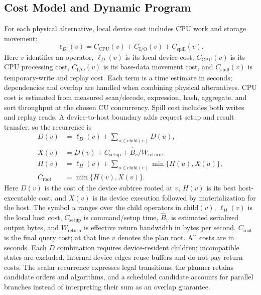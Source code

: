 \documentclass[sigconf, nonacm]{acmart}
\begin{document}
\subsection{Cost Model and Dynamic Program}
For each physical alternative, local device cost includes CPU work and
storage movement:
\begin{equation}
 \ell_D(v)=C_{\mathrm{CPU}}(v)+C_{\mathrm{I/O}}(v)
                          +C_{\mathrm{spill}}(v).
\end{equation}
Here $v$ identifies an operator, $\ell_D(v)$ is its local device cost,
$C_{\mathrm{CPU}}(v)$ is its CPU processing cost, $C_{\mathrm{I/O}}(v)$ is
its base-data movement cost, and $C_{\mathrm{spill}}(v)$ is temporary-write
and replay cost. Each term is a time estimate in seconds; dependencies and
overlap are handled when combining physical alternatives.
CPU cost is estimated from measured scan/decode, expression, hash, aggregate,
and sort throughput at the chosen CU concurrency. Spill cost includes both
writes and replay reads. A device-to-host boundary adds request setup and
result transfer, so the recurrence is
\begin{align}
 D(v)&=\ell_D(v)+\sum_{u\in\mathrm{child}(v)}D(u),\\
 X(v)&=D(v)+C_{\mathrm{setup}}+\widehat{B}_v/W_{\mathrm{return}},\\
 H(v)&=\ell_H(v)+\sum_{u\in\mathrm{child}(v)}\min\{H(u),X(u)\},\\
 C_{\mathrm{root}}&=\min\{H(v),X(v)\}.
\label{eq:dp}
\end{align}
Here $D(v)$ is the cost of the device subtree rooted at $v$, $H(v)$ is
its best host-executable cost, and $X(v)$ is its device execution followed
by materialization for the host. The symbol $u$ ranges over the child
operators in $\mathrm{child}(v)$, $\ell_H(v)$ is the local host cost,
$C_{\mathrm{setup}}$ is command/setup time, $\widehat{B}_v$ is estimated
serialized output bytes, and $W_{\mathrm{return}}$ is effective return
bandwidth in bytes per second. $C_{\mathrm{root}}$ is the final query cost;
at that line $v$ denotes the plan root. All costs are in seconds. Each $D$
combination requires device-resident children; incompatible states are
excluded. Internal device edges reuse buffers and do not pay return costs.
The scalar recurrence expresses legal transitions; the planner retains
candidate orders and algorithms, and a scheduled candidate accounts for
parallel branches instead of interpreting their sum as an overlap guarantee.
\end{document}
